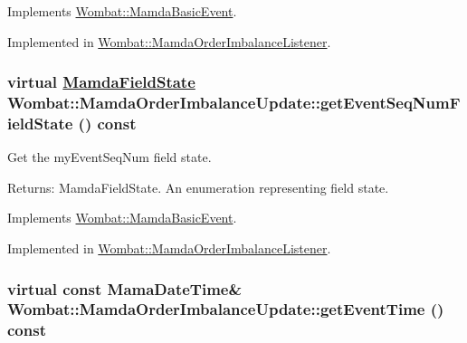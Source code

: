 Implements \hyperlink{classWombat_1_1MamdaBasicEvent_1fd845d48e95b4ee3beafc72d1ac2adf}{Wombat::Mamda\-Basic\-Event}.

Implemented in \hyperlink{classWombat_1_1MamdaOrderImbalanceListener_3a6ecd36b855f2e1f122d07764a6b691}{Wombat::Mamda\-Order\-Imbalance\-Listener}.\hypertarget{classWombat_1_1MamdaOrderImbalanceUpdate_a27a3b4da03381d79a52f6f0d92ff76c}{
\subsubsection[getEventSeqNumFieldState]{\setlength{\rightskip}{0pt plus 5cm}virtual \hyperlink{namespaceWombat_93aac974f2ab713554fd12a1fa3b7d2a}{Mamda\-Field\-State} Wombat::Mamda\-Order\-Imbalance\-Update::get\-Event\-Seq\-Num\-Field\-State () const}}
\label{classWombat_1_1MamdaOrderImbalanceUpdate_a27a3b4da03381d79a52f6f0d92ff76c}


Get the my\-Event\-Seq\-Num field state. 

\begin{Desc}
\item[Returns:]Mamda\-Field\-State. An enumeration representing field state. \end{Desc}


Implements \hyperlink{classWombat_1_1MamdaBasicEvent_51cc0b9d4c2b8a982ccd18b339707cb5}{Wombat::Mamda\-Basic\-Event}.

Implemented in \hyperlink{classWombat_1_1MamdaOrderImbalanceListener_1daae80b39ea6a070f2fa736fe90437d}{Wombat::Mamda\-Order\-Imbalance\-Listener}.\hypertarget{classWombat_1_1MamdaOrderImbalanceUpdate_b2468935aefaa514c68cd2722addc9ba}{
\subsubsection[getEventTime]{\setlength{\rightskip}{0pt plus 5cm}virtual const Mama\-Date\-Time\& Wombat::Mamda\-Order\-Imbalance\-Update::get\-Event\-Time () const}}
\label{classWombat_1_1MamdaOrderImbalanceUpdate_b2468935aefaa514c68cd2722addc9ba}


